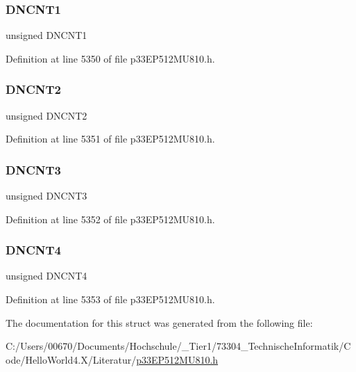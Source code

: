 \subsubsection{\texorpdfstring{D\+N\+C\+N\+T1}{DNCNT1}}
{\footnotesize\ttfamily unsigned D\+N\+C\+N\+T1}



Definition at line 5350 of file p33\+E\+P512\+M\+U810.\+h.

\mbox{\label{structtag_c2_c_t_r_l2_b_i_t_s_a1a347041cec37b585f3e4809f26e742b}} 
\subsubsection{\texorpdfstring{D\+N\+C\+N\+T2}{DNCNT2}}
{\footnotesize\ttfamily unsigned D\+N\+C\+N\+T2}



Definition at line 5351 of file p33\+E\+P512\+M\+U810.\+h.

\mbox{\label{structtag_c2_c_t_r_l2_b_i_t_s_aefe3e090728f03e982e016058f54196e}} 
\subsubsection{\texorpdfstring{D\+N\+C\+N\+T3}{DNCNT3}}
{\footnotesize\ttfamily unsigned D\+N\+C\+N\+T3}



Definition at line 5352 of file p33\+E\+P512\+M\+U810.\+h.

\mbox{\label{structtag_c2_c_t_r_l2_b_i_t_s_afeca93a17ca8b9136cf43834d3c30f1e}} 
\subsubsection{\texorpdfstring{D\+N\+C\+N\+T4}{DNCNT4}}
{\footnotesize\ttfamily unsigned D\+N\+C\+N\+T4}



Definition at line 5353 of file p33\+E\+P512\+M\+U810.\+h.



The documentation for this struct was generated from the following file\+:\begin{DoxyCompactItemize}
\item 
C\+:/\+Users/00670/\+Documents/\+Hochschule/\+\_\+\+Tier1/73304\+\_\+\+Technische\+Informatik/\+Code/\+Hello\+World4.\+X/\+Literatur/\hyperlink{p33_e_p512_m_u810_8h}{p33\+E\+P512\+M\+U810.\+h}\end{DoxyCompactItemize}
